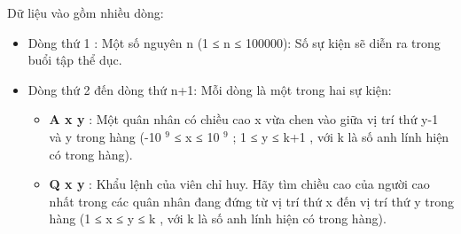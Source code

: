 Dữ liệu vào gồm nhiều dòng:  
\begin{itemize}
	\item     Dòng thứ 1 : Một số nguyên n (1 ≤ n ≤ 100000): Số sự kiện sẽ diễn ra trong buổi tập thể dục.   
	\item     Dòng thứ 2 đến dòng thứ n+1: Mỗi dòng là một trong hai sự kiện:    
\begin{itemize}
	\item \textbf{       A x y      }      : Một quân nhân có chiều cao x vừa chen vào giữa vị trí thứ y-1 và y trong hàng (-10      $^       9      $      ≤ x ≤ 10      $^       9      $      ; 1 ≤ y ≤ k+1 , với k là số anh lính hiện có trong hàng).     
	\item \textbf{       Q x y      }      : Khẩu lệnh của viên chỉ huy. Hãy tìm chiều cao của người cao nhất trong các quân nhân đang đứng từ vị trí thứ x đến vị trí thứ y trong hàng (1 ≤ x ≤ y ≤ k , với k là số anh lính hiện có trong hàng).     
\end{itemize}
\end{itemize}



\